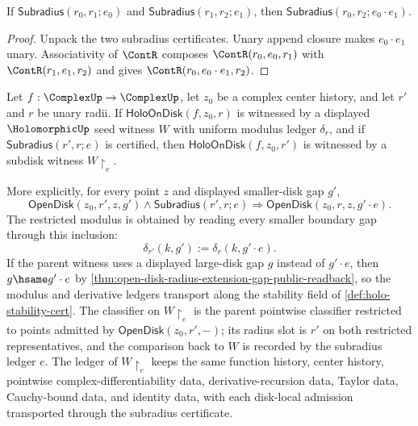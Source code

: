 \begin{lemma}
\label{lem:holo-certified-subdisk-radius-compose}
If $\mathsf{Subradius}(r_0,r_1;e_0)$ and $\mathsf{Subradius}(r_1,r_2;e_1)$, then $\mathsf{Subradius}(r_0,r_2;e_0\cdot e_1)$.
\end{lemma}
\begin{proof}
Unpack the two subradius certificates. Unary append closure makes $e_0\cdot e_1$ unary. Associativity of $\ContR$ composes $\ContR(r_0,e_0,r_1)$ with $\ContR(r_1,e_1,r_2)$ and gives $\ContR(r_0,e_0\cdot e_1,r_2)$.
\end{proof}

\begin{theorem}
\label{thm:holo-on-disk-subdisk-restriction}
Let $f : \ComplexUp \to \ComplexUp$, let $z_0$ be a complex center history, and let $r'$ and $r$ be unary radii. If $\mathsf{HoloOnDisk}(f,z_0,r)$ is witnessed by a displayed $\HolomorphicUp$ seed witness $W$ with uniform modulus ledger $\delta_r$, and if $\mathsf{Subradius}(r',r;e)$ is certified, then $\mathsf{HoloOnDisk}(f,z_0,r')$ is witnessed by a subdisk witness $W\!\restriction_e$.

More explicitly, for every point $z$ and displayed smaller-disk gap $g'$,
$$
\mathsf{OpenDisk}(z_0,r',z,g')\land\mathsf{Subradius}(r',r;e)
\Longrightarrow
\mathsf{OpenDisk}(z_0,r,z,g'\cdot e).
$$
The restricted modulus is obtained by reading every smaller boundary gap through this inclusion:
$$
\delta_{r'}(k,g') := \delta_r(k,g'\cdot e).
$$
If the parent witness uses a displayed large-disk gap $g$ instead of $g'\cdot e$, then $g\hsame g'\cdot e$ by \autoref{thm:open-disk-radius-extension-gap-public-readback}, so the modulus and derivative ledgers transport along the stability field of \autoref{def:holo-stability-cert}. The classifier on $W\!\restriction_e$ is the parent pointwise classifier restricted to points admitted by $\mathsf{OpenDisk}(z_0,r',-)$; its radius slot is $r'$ on both restricted representatives, and the comparison back to $W$ is recorded by the subradius ledger $e$. The ledger of $W\!\restriction_e$ keeps the same function history, center history, pointwise complex-differentiability data, derivative-recursion data, Taylor data, Cauchy-bound data, and identity data, with each disk-local admission transported through the subradius certificate.
\end{theorem}
